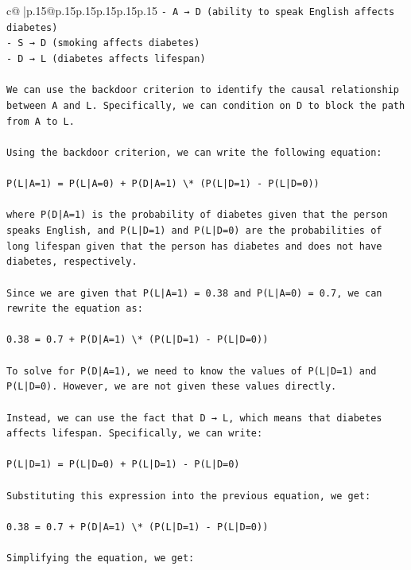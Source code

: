 \documentclass{article}
\begin{document}
{\begin{supertabular}{c@{$\;$}|p{.15\linewidth}@{}p{.15\linewidth}p{.15\linewidth}p{.15\linewidth}p{.15\linewidth}p{.15\linewidth}}
{{{\texttt{{-} A → D (ability to speak English affects diabetes)} \\
\texttt{{-} S → D (smoking affects diabetes)} \\
\texttt{{-} D → L (diabetes affects lifespan)} \\
\\ 
\texttt{We can use the backdoor criterion to identify the causal relationship between A and L. Specifically, we can condition on D to block the path from A to L.} \\
\\ 
\texttt{Using the backdoor criterion, we can write the following equation:} \\
\\ 
\texttt{P(L|A=1) = P(L|A=0) + P(D|A=1) \textbackslash{}* (P(L|D=1) {-} P(L|D=0))} \\
\\ 
\texttt{where P(D|A=1) is the probability of diabetes given that the person speaks English, and P(L|D=1) and P(L|D=0) are the probabilities of long lifespan given that the person has diabetes and does not have diabetes, respectively.} \\
\\ 
\texttt{Since we are given that P(L|A=1) = 0.38 and P(L|A=0) = 0.7, we can rewrite the equation as:} \\
\\ 
\texttt{0.38 = 0.7 + P(D|A=1) \textbackslash{}* (P(L|D=1) {-} P(L|D=0))} \\
\\ 
\texttt{To solve for P(D|A=1), we need to know the values of P(L|D=1) and P(L|D=0). However, we are not given these values directly.} \\
\\ 
\texttt{Instead, we can use the fact that D → L, which means that diabetes affects lifespan. Specifically, we can write:} \\
\\ 
\texttt{P(L|D=1) = P(L|D=0) + P(L|D=1) {-} P(L|D=0)} \\
\\ 
\texttt{Substituting this expression into the previous equation, we get:} \\
\\ 
\texttt{0.38 = 0.7 + P(D|A=1) \textbackslash{}* (P(L|D=1) {-} P(L|D=0))} \\
\\ 
\texttt{Simplifying the equation, we get:} \\
\\ 
}}}
\end{supertabular}}
\end{document}
